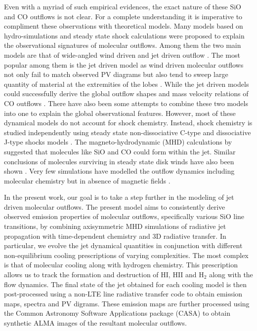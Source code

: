 \documentclass[useAMS,usenatbib,letters]{mn2e}
\begin{document}
Even with a myriad of such empirical evidences, the exact nature of
these SiO and CO outflows is not clear. For a complete understanding it is imperative
to compliment these observations with theoretical models. Many models
based on hydro-simulations and steady state shock calculations
were proposed to explain the observational signatures of molecular
outflows. Among them the two main models are that of wide-angled wind
driven \cite{Shu:1991p14071} and jet driven outflow
\cite{Canto:1991p14123}. 
The most popular among them is the jet driven model as wind
driven molecular outflows not only fail to match observed PV diagrams \cite{Cabrit:1992p14098}
but also tend to sweep large quantity of material at the extremities
of the lobes \cite{Masson:1992p14101}. While the jet driven models could successfully
derive the global outflow shapes and mass velocity relations of CO
outflows \citep{Raga:1993p9948, Masson:1993p9661} . There have also been some attempts to combine these two
models into one \cite{Shang:2006p14268} to explain the global observational features. 
However, most of these dynamical models do not
account for shock chemistry. Instead, shock chemistry is studied
independently using steady state non-dissociative C-type and
dissociative J-type shocks models \citep{Neufeld:1989p11689, Schilke:1997p14140,Flower:2003p11236}. 
The magneto-hydrodynamic (MHD) calculations by \cite{Glassgold:1991p13703} suggested that molecules
like SiO and CO could form within the jet. Similar conclusions of
molecules surviving in steady state disk winds have also been shown
\cite{Panoglou:2012p10039}. 
Very few simulations have modelled the outflow
dynamics including molecular chemistry but in absence of
magnetic fields \citep{Raga:1995p12965, Smith:2003p9985}. 


%
In the present work, our goal is to take a step further in the modeling of
jet driven molecular outflows. The present model aims to consistently derive observed emission properties of molecular outflows, specifically various SiO line
transitions, by combining axisymmetric MHD simulations of
radiative jet propagation with time-dependent chemistry and 3D radiative
transfer. In particular, we evolve the jet dynamical
quantities in conjunction with different non-equilibrium cooling
prescriptions of varying complexities. The most complex is that of
molecular cooling along with hydrogen chemistry. This prescription
allows us to track the formation and destruction of 
HI, HII and H$_{2}$ along with the flow dynamics. 
The final state of the jet obtained for each cooling model is then
post-processed using a non-LTE line radiative transfer code
to obtain emission maps, spectra and PV digrams. These emission maps
are further processed using the Common Astronomy Software Applications
package (CASA) to obtain synthetic ALMA images of the resultant molecular outflows.
%
\end{document}
